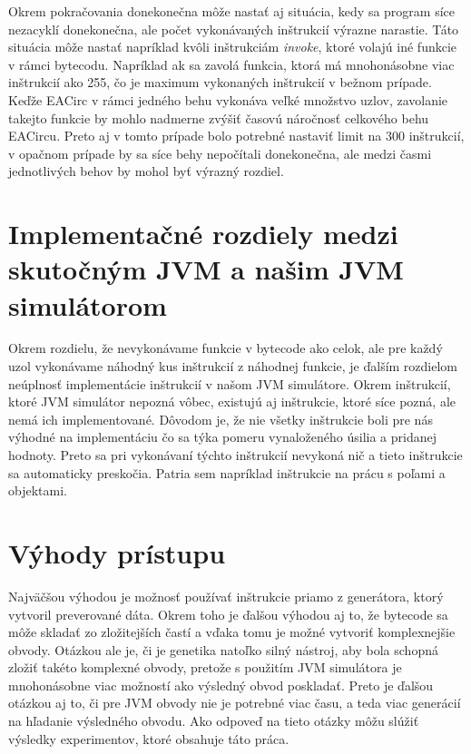 Okrem pokračovania donekonečna môže nastať aj situácia, kedy sa program síce nezacyklí donekonečna, ale počet vykonávaných inštrukcií výrazne narastie. Táto situácia môže nastať napríklad kvôli inštrukciám \textit{invoke}, ktoré volajú iné funkcie v rámci bytecodu. Napríklad ak sa zavolá funkcia, ktorá má mnohonásobne viac inštrukcií ako 255, čo je maximum vykonaných inštrukcií v bežnom prípade. Keďže EACirc v rámci jedného behu vykonáva veľké množstvo uzlov, zavolanie takejto funkcie by mohlo nadmerne zvýšiť časovú náročnosť celkového behu EACircu. Preto aj v tomto prípade bolo potrebné nastaviť limit na 300 inštrukcií, v opačnom prípade by sa síce behy nepočítali donekonečna, ale medzi časmi jednotlivých behov by mohol byť výrazný rozdiel.

\section{Implementačné rozdiely medzi skutočným JVM a našim JVM simulátorom}
\label{sec:impl-diff}

Okrem rozdielu, že nevykonávame funkcie v bytecode ako celok, ale pre každý uzol vykonávame náhodný kus inštrukcií z náhodnej funkcie, je ďalším rozdielom neúplnosť implementácie inštrukcií v našom JVM simulátore. Okrem inštrukcií, ktoré JVM simulátor nepozná vôbec, existujú aj inštrukcie, ktoré síce pozná, ale nemá ich implementované. Dôvodom je, že nie všetky inštrukcie boli pre nás výhodné na implementáciu čo sa týka pomeru vynaloženého úsilia a pridanej hodnoty. Preto sa pri vykonávaní týchto inštrukcií nevykoná nič a tieto inštrukcie sa automaticky preskočia. Patria sem napríklad inštrukcie na prácu s poľami a objektami.

\section{Výhody prístupu}
\label{sec:advantages}

Najväčšou výhodou je možnosť používať inštrukcie priamo z generátora, ktorý vytvoril preverované dáta. Okrem toho je ďalšou výhodou aj to, že bytecode sa môže skladať zo zložitejších častí a vďaka tomu je možné vytvoriť komplexnejšie obvody. Otázkou ale je, či je genetika natoľko silný nástroj, aby bola schopná zložiť takéto komplexné obvody, pretože s použitím JVM simulátora je mnohonásobne viac možností ako výsledný obvod poskladať. Preto je ďalšou otázkou aj to, či pre JVM obvody nie je potrebné viac času, a teda viac generácií na hľadanie výsledného obvodu. Ako odpoveď na tieto otázky môžu slúžiť výsledky experimentov, ktoré obsahuje táto práca.

